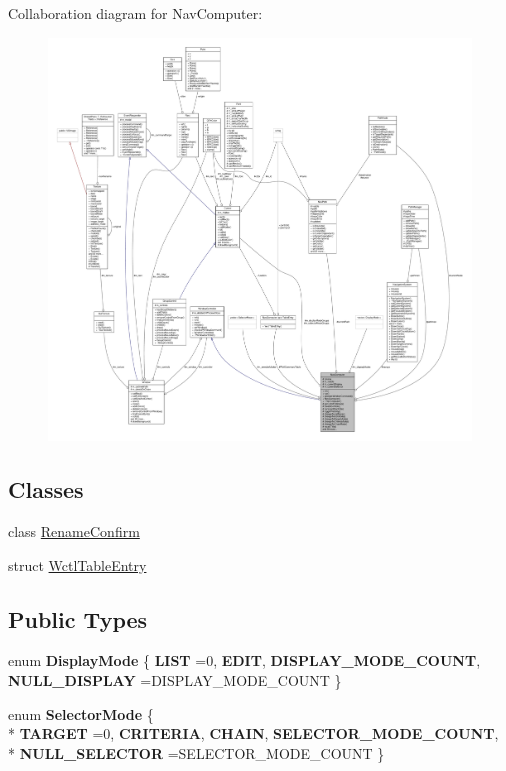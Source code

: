 Collaboration diagram for Nav\+Computer\+:
\nopagebreak
\begin{figure}[H]
\begin{center}
\leavevmode
\includegraphics[width=350pt]{df/dc9/classNavComputer__coll__graph}
\end{center}
\end{figure}
\subsection*{Classes}
\begin{DoxyCompactItemize}
\item 
class \hyperlink{classNavComputer_1_1RenameConfirm}{Rename\+Confirm}
\item 
struct \hyperlink{structNavComputer_1_1WctlTableEntry}{Wctl\+Table\+Entry}
\end{DoxyCompactItemize}
\subsection*{Public Types}
\begin{DoxyCompactItemize}
\item 
enum {\bfseries Display\+Mode} \{ {\bfseries L\+I\+ST} =0, 
{\bfseries E\+D\+IT}, 
{\bfseries D\+I\+S\+P\+L\+A\+Y\+\_\+\+M\+O\+D\+E\+\_\+\+C\+O\+U\+NT}, 
{\bfseries N\+U\+L\+L\+\_\+\+D\+I\+S\+P\+L\+AY} =D\+I\+S\+P\+L\+A\+Y\+\_\+\+M\+O\+D\+E\+\_\+\+C\+O\+U\+NT
 \}\hypertarget{classNavComputer_a593aa0f75480f6991ce37c5c2d8101bc}{}\label{classNavComputer_a593aa0f75480f6991ce37c5c2d8101bc}

\item 
enum {\bfseries Selector\+Mode} \{ \\*
{\bfseries T\+A\+R\+G\+ET} =0, 
{\bfseries C\+R\+I\+T\+E\+R\+IA}, 
{\bfseries C\+H\+A\+IN}, 
{\bfseries S\+E\+L\+E\+C\+T\+O\+R\+\_\+\+M\+O\+D\+E\+\_\+\+C\+O\+U\+NT}, 
\\*
{\bfseries N\+U\+L\+L\+\_\+\+S\+E\+L\+E\+C\+T\+OR} =S\+E\+L\+E\+C\+T\+O\+R\+\_\+\+M\+O\+D\+E\+\_\+\+C\+O\+U\+NT
 \}\hypertarget{classNavComputer_ae1dc79f81832020b19860c72dd4d614a}{}\label{classNavComputer_ae1dc79f81832020b19860c72dd4d614a}

\end{DoxyCompactItemize}

